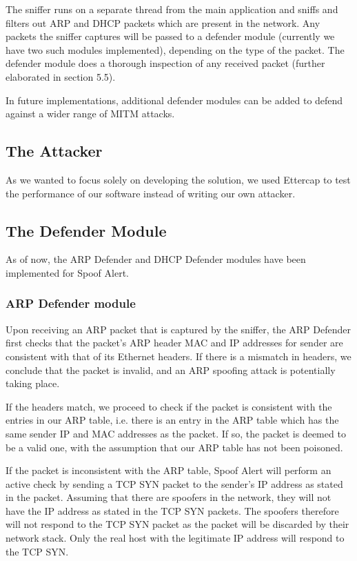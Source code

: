 \documentclass{acm_proc_article-sp}
\begin{document}
The sniffer runs on a separate thread from the main application and sniffs and filters out ARP and DHCP packets which are present in the network. Any packets the sniffer captures will be passed to a defender module (currently we have two such modules implemented), depending on the type of the packet. The defender module does a thorough inspection of any received packet (further elaborated in section 5.5). 

In future implementations, additional defender modules can be added to defend against a wider range of MITM attacks.

\subsection{The Attacker}

As we wanted to focus solely on developing the solution, we used Ettercap to test the performance of our software instead of writing our own attacker.  

\subsection{The Defender Module}

As of now, the ARP Defender and DHCP Defender modules have been implemented for Spoof Alert.

\subsubsection{ARP Defender module}

Upon receiving an ARP packet that is captured by the sniffer, the ARP Defender first checks that the packet's ARP header MAC and IP addresses for sender are consistent with that of its Ethernet headers. If there is a mismatch in headers, we conclude that the packet is invalid, and an ARP spoofing attack is potentially taking place.

If the headers match, we proceed to check if the packet is consistent with the entries in our ARP table, i.e. there is an entry in the ARP table which has the same sender IP and MAC addresses as the packet. If so, the packet is deemed to be a valid one, with the assumption that our ARP table has not been poisoned.

If the packet is inconsistent with the ARP table, Spoof Alert will perform an active check by sending a TCP SYN packet to the sender's IP address as stated in the packet. Assuming that there are spoofers in the network, they will not have the IP address as stated in the TCP SYN packets. The spoofers therefore will not respond to the TCP SYN packet as the packet will be discarded by their network stack. Only the real host with the legitimate IP address will respond to the TCP SYN.
\end{document}

